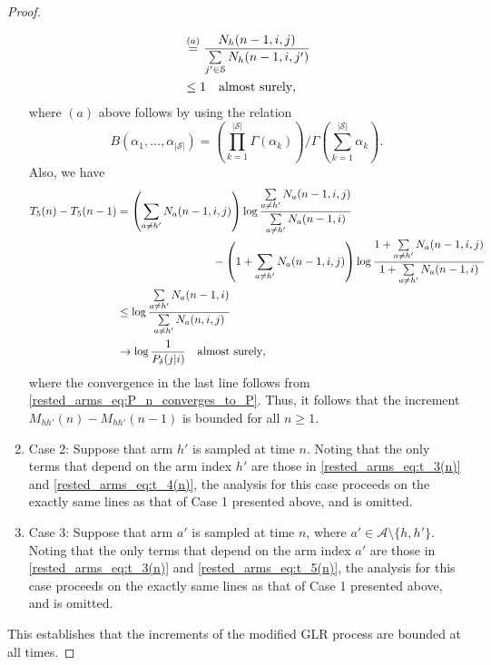 \begin{proof}
\begin{enumerate}
\begin{align}
		    	&\stackrel{(a)}{=}\frac{N_h(n-1,i,j)}{\sum\limits_{j'\in\mathcal{S}}N_h(n-1,i,j')}\nonumber\\
		    	&\leq 1\quad \text{\text{almost surely}},
		    \end{align}\endgroup
		    where $(a)$ above follows by using the relation
		    \begin{equation}
		    	B(\alpha_1,\ldots,\alpha_{|\mathcal{S}|})=\left({\prod\limits_{k=1}^{|\mathcal{S}|}\Gamma(\alpha_k)}\right)\bigg/{\Gamma\left(\sum\limits_{k=1}^{|\mathcal{S}|}\alpha_k\right)}.
		    \end{equation}
		    Also, we have
		    \begingroup\allowdisplaybreaks\begin{align}
		    	T_5(n)-T_5(n-1)&=\left(\sum\limits_{a\neq h'}N_a(n-1,i,j)\right)\log\frac{\sum\limits_{a\neq h'}N_a(n-1,i,j)}{\sum\limits_{a\neq h'}N_a(n-1,i)}\nonumber\\
		    	&\hspace{3cm}-\left(1+\sum\limits_{a\neq h'}N_a(n-1,i,j)\right)\log \frac{1+\sum\limits_{a\neq h'}N_a(n-1,i,j)}{1+\sum\limits_{a\neq h'}N_a(n-1,i)}\nonumber\\
		    	&\leq \log\frac{\sum\limits_{a\neq h'}N_a(n-1,i)}{\sum\limits_{a\neq h'}N_a(n,i,j)}\nonumber\\
		    	&\to\log \frac{1}{P_\delta(j|i)}\quad \text{\text{almost surely}},
		    \end{align}\endgroup
		    where the convergence in the last line follows from \eqref{rested_arms_eq:P_n_converges_to_P}. Thus, it follows that the increment $M_{hh'}(n)-M_{hh'}(n-1)$ is bounded for all $n\geq 1$.
		    \item Case 2: Suppose that arm $h'$ is sampled at time $n$. Noting that the only terms that depend on the arm index $h'$ are those in \eqref{rested_arms_eq:t_3(n)} and \eqref{rested_arms_eq:t_4(n)},
		      the analysis for this case proceeds on the exactly same lines as that of Case 1 presented above, and is omitted.
		    \item Case 3: Suppose that arm $a'$ is sampled at time $n$, where $a'\in\mathcal{A}\setminus\{h,h'\}$. Noting that the only terms that depend on the arm index $a'$ are those in \eqref{rested_arms_eq:t_3(n)} and \eqref{rested_arms_eq:t_5(n)},
		      the analysis for this case proceeds on the exactly same lines as that of Case 1 presented above, and is omitted.
	\end{enumerate}
This establishes that the increments of the modified GLR process are bounded at all times.


\end{proof}
